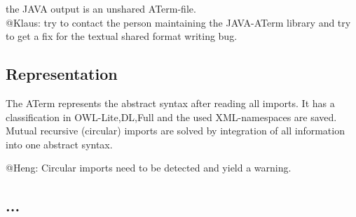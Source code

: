 \documentclass[11pt,a4paper]{article}
\begin{document}
   the JAVA output is an unshared ATerm-file.\\

   @Klaus: try to contact the person maintaining the JAVA-ATerm
   library and try to get a fix for the textual shared format writing
   bug. 

\subsection{Representation}
The ATerm represents the abstract syntax after reading all
   imports. It has a classification in OWL-{Lite,DL,Full} and the used
   XML-namespaces are saved. Mutual recursive (circular) imports are
   solved by integration of all information into one abstract syntax.

   @Heng: Circular imports need to be detected and yield a
   warning.
   
 \subsection{ ...}
\end{document}
